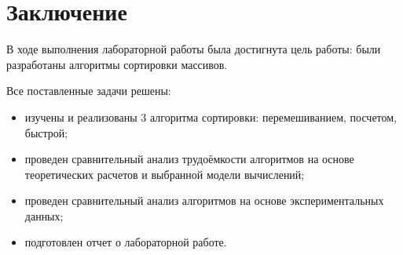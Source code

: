 \chapter*{Заключение}

В ходе выполнения лабораторной работы была достигнута цель работы: были разработаны алгоритмы сортировки массивов.

Все поставленные задачи решены:
\begin{itemize}
	\item изучены и реализованы 3 алгоритма сортировки: перемешиванием, посчетом, быстрой;
	\item проведен сравнительный анализ трудоёмкости алгоритмов на основе теоретических расчетов и выбранной модели вычислений;
	\item проведен сравнительный анализ алгоритмов на основе экспериментальных данных;
	\item подготовлен отчет о лабораторной работе.
\end{itemize}


